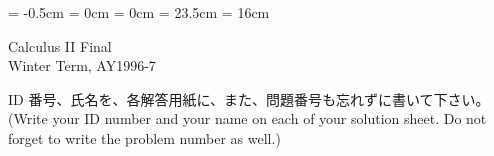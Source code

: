 

\topmargin = -0.5cm
\oddsidemargin = 0cm \evensidemargin = 0cm
\textheight = 23.5cm \textwidth = 16cm

\pagestyle{empty}

\newtheorem{thm}{定理}
\newcommand{\proof}{{\gt 証明\quad}}
\newcommand{\qed}{\hfill\hbox{\rule{6pt}{6pt}}}

\def\inkern{\mathchoice{\!\!\!}{\!\!}{\!\!}{\!\!}}
\def\iint{\int\inkern\int} %
\def\iiint{\int\inkern\int\inkern\int} %


\begin{center}
{\gt\LARGE Calculus II  Final}\\
{\gt Winter Term, AY1996-7}
\end{center}

\bigskip
\noindent
ID 番号、氏名を、各解答用紙に、また、問題番号も忘れずに書いて下さい。\\
(Write your ID number and your name on each of your solution sheet. Do not forget to write the problem number as well.)

